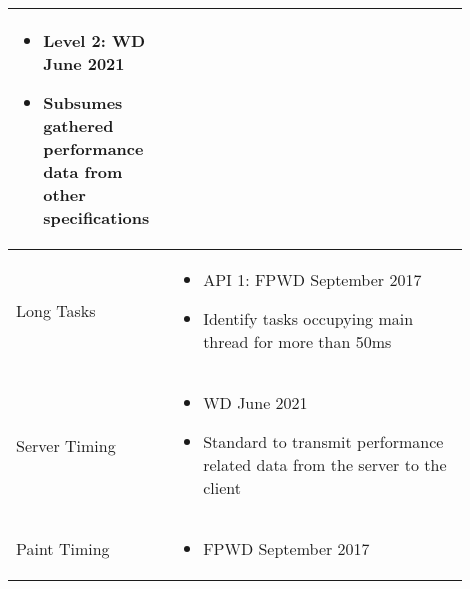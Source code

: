 \begin{center}
\begin{tabular}{ p{0.3\linewidth} | p{0.6\linewidth} }
\begin{itemize}[label={}, noitemsep,nolistsep, leftmargin=0cm]
		\item Level 2: WD June 2021
		\item Subsumes gathered performance data from other specifications
	\end{itemize} \\
	\hline
	Long Tasks &
	\begin{itemize}[label={}, noitemsep,nolistsep, leftmargin=0cm]
		\item API 1: FPWD  September 2017 
		\item Identify tasks occupying main thread for more than 50ms
	\end{itemize} \\	
	\hline
	Server Timing &
	\begin{itemize}[label={}, noitemsep,nolistsep, leftmargin=0cm]
		\item WD June 2021
		\item Standard to transmit performance related data from the server to the client
	\end{itemize} \\	
	\hline
	Paint Timing &
	\begin{itemize}[label={}, noitemsep,nolistsep, leftmargin=0cm]
		\item FPWD September 2017
	\end{itemize} \\
	\hline
	\end{tabular}
\end{center}










